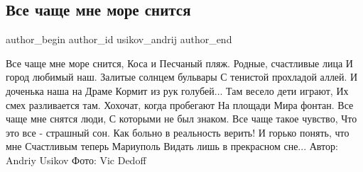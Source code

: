  
 
 
 
 
 
\subsection{Все чаще мне море снится}
\label{sec:29_05_2022.fb.usikov_andrij.1.more_mariupol}
 
\ifcmt
 author_begin
   author_id usikov_andrij
 author_end
\fi

\raggedcolumns
\begin{multicols}{2} %
\setlength{\parindent}{0pt}

\Large
\obeycr
Все чаще мне море снится,
Коса и Песчаный пляж.
Родные, счастливые лица
И город любимый наш.
\smallskip
Залитые солнцем бульвары
С тенистой прохладой аллей.
И доченька наша на Драме
Кормит из рук голубей...
\smallskip
Там весело дети играют,
Их смех разливается там.
Хохочат, когда пробегают
На площади Мира фонтан.
\smallskip
Все чаще мне снятся люди,
С которыми не был знаком.
Все чаще такое чувство,
Что это все - страшный сон.
\smallskip
Как больно в реальность верить!
И горько понять, что мне
Счастливым теперь Мариуполь
Видать лишь в прекрасном сне...
\smallskip
Автор: Andriy Usikov 
\smallskip
Фото: Vic Dedoff
\restorecr

\end{multicols} %


